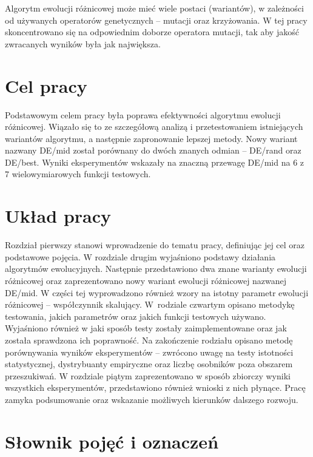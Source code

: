 \documentclass[a4paper,onecolumn,oneside,12pt,wide,floatssmall]{mwrep}
\theoremstyle{definition}
\theoremstyle{plain}%
\theoremstyle{remark}
\begin{document}
Algorytm ewolucji różnicowej może mieć wiele postaci (wariantów), w zależności od używanych
operatorów genetycznych -- mutacji oraz krzyżowania. 
W tej pracy skoncentrowano się na odpowiednim doborze operatora mutacji, 
tak aby jakość zwracanych wyników była jak największa.

\section{Cel pracy}

Podstawowym celem pracy była poprawa efektywności algorytmu ewolucji różnicowej.
Wiązało się to ze szczegółową analizą i przetestowaniem istniejących wariantów algorytmu,
a następnie zapronowanie lepszej metody. Nowy wariant nazwany DE/mid został porównany 
do dwóch znanych odmian -- DE/rand oraz DE/best. 
Wyniki eksperymentów wskazały na znaczną przewagę DE/mid na 6 z 7 wielowymiarowych funkcji testowych.

\section{Układ pracy}

Rozdział pierwszy stanowi wprowadzenie do tematu pracy, definiując jej cel oraz podstawowe pojęcia.
W rozdziale drugim wyjaśniono podstawy działania algorytmów ewolucyjnych. 
Następnie przedstawiono dwa znane warianty ewolucji różnicowej oraz 
zaprezentowano nowy wariant ewolucji różnicowej nazwanej DE/mid. W części tej wyprowadzono również
wzory na istotny parametr ewolucji różnicowej -- współczynnik skalujący. 
W~rodziale czwartym opisano metodykę testowania, jakich parametrów oraz jakich funkcji testowych 
używano.
Wyjaśniono również w jaki sposób testy zostały 
zaimplementowane oraz jak została sprawdzona ich poprawność. Na zakończenie rodziału opisano
metodę porównywania wyników eksperymentów -- zwrócono uwagę na testy istotności 
statystycznej, dystrybuanty empiryczne oraz liczbę osobników poza obszarem przeszukiwań.
W rozdziale piątym zaprezentowano w sposób zbiorczy wyniki wszystkich eksperymentów,
przedstawiono również wnioski z nich płynące. 
Pracę zamyka podsumowanie oraz wskazanie możliwych kierunków dalszego rozwoju.

\section{Słownik pojęć i oznaczeń}
\end{document}
